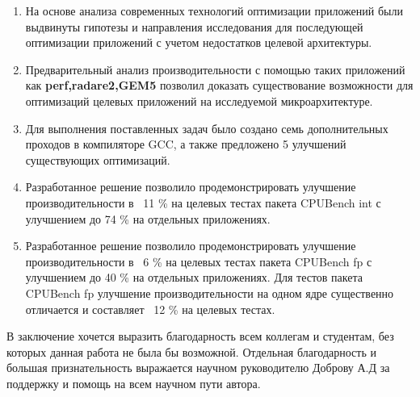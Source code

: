 \begin{enumerate}
	\item На основе анализа современных технологий оптимизации приложений были выдвинуты гипотезы и направления исследования для последующей оптимизации приложений с учетом недостатков целевой архитектуры.
	\item Предварительный анализ производительности с помощью таких приложений как \textbf{perf,radare2,GEM5} позволил доказать существование возможности  для оптимизаций целевых приложений на исследуемой микроархитектуре. 
	\item Для выполнения поставленных задач было создано семь дополнительных проходов в компиляторе GCC, а также предложено 5 улучшений существующих оптимизаций.
	\item Разработанное решение позволило продемонстрировать улучшение производительности в ~11 \% на целевых тестах пакета CPUBench int  с улучшением до 74 \% на отдельных приложениях. 
	\item Разработанное решение позволило продемонстрировать улучшение производительности в ~6 \% на целевых тестах пакета CPUBench fp  с улучшением до 40 \% на отдельных приложениях. Для тестов пакета CPUBench fp улучшение производительности на  одном ядре существенно отличается и составляет ~12 \% на целевых тестах.
\end{enumerate}

В заключение хочется выразить благодарность всем коллегам и студентам, без которых данная работа не была бы возможной. Отдельная благодарность и большая признательность выражается научном руководителю Доброву А.Д за поддержку и помощь на всем научном пути автора.

